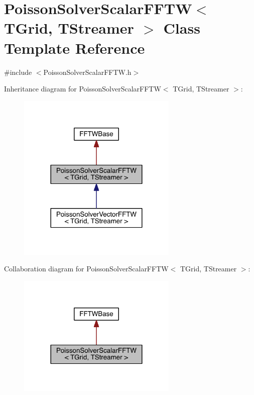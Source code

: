 \hypertarget{class_poisson_solver_scalar_f_f_t_w}{}\section{Poisson\+Solver\+Scalar\+F\+F\+T\+W$<$ T\+Grid, T\+Streamer $>$ Class Template Reference}
\label{class_poisson_solver_scalar_f_f_t_w}


{\ttfamily \#include $<$Poisson\+Solver\+Scalar\+F\+F\+T\+W.\+h$>$}



Inheritance diagram for Poisson\+Solver\+Scalar\+F\+F\+T\+W$<$ T\+Grid, T\+Streamer $>$\+:\nopagebreak
\begin{figure}[H]
\begin{center}
\leavevmode
\includegraphics[width=216pt]{d6/daa/class_poisson_solver_scalar_f_f_t_w__inherit__graph}
\end{center}
\end{figure}


Collaboration diagram for Poisson\+Solver\+Scalar\+F\+F\+T\+W$<$ T\+Grid, T\+Streamer $>$\+:\nopagebreak
\begin{figure}[H]
\begin{center}
\leavevmode
\includegraphics[width=216pt]{d4/d21/class_poisson_solver_scalar_f_f_t_w__coll__graph}
\end{center}
\end{figure}
